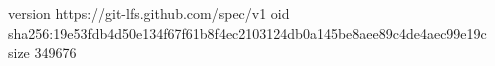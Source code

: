 version https://git-lfs.github.com/spec/v1
oid sha256:19e53fdb4d50e134f67f61b8f4ec2103124db0a145be8aee89c4de4aec99e19c
size 349676
